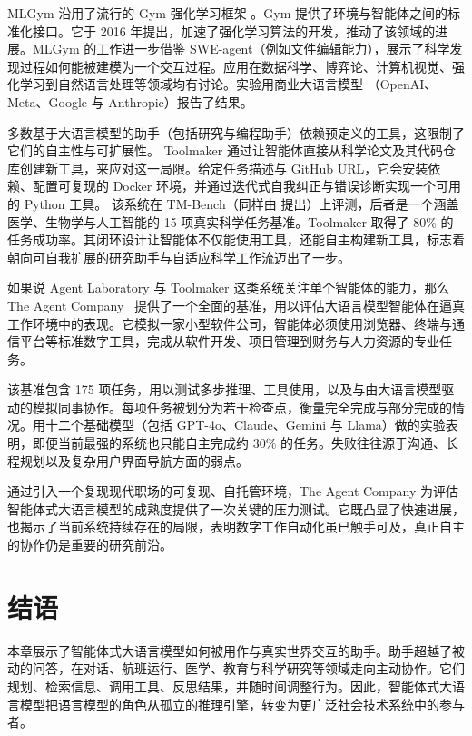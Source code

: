 MLGym \citep{nathani2025mlgym} 沿用了流行的 Gym 强化学习框架 \citep{brockman2016openai}。Gym 提供了环境与智能体之间的标准化接口。它于 2016 年提出，加速了强化学习算法的开发，推动了该领域的进展。MLGym 的工作进一步借鉴 SWE-agent（例如文件编辑能力），展示了科学发现过程如何能被建模为一个交互过程。应用在数据科学、博弈论、计算机视觉、强化学习到自然语言处理等领域均有讨论。实验用商业大语言模型
（OpenAI、Meta、Google 与 Anthropic）报告了结果。

多数基于大语言模型的助手（包括研究与编程助手）依赖预定义的工具，这限制了它们的自主性与可扩展性。
%
Toolmaker \citep{wolflein2025llm} 通过让智能体直接从科学论文及其代码仓库创建新工具，来应对这一局限。给定任务描述与 GitHub URL，它会安装依赖、配置可复现的 Docker 环境，并通过迭代式自我纠正与错误诊断实现一个可用的 Python 工具。
该系统在 TM-Bench（同样由 \citet{wolflein2025llm} 提出）上评测，后者是一个涵盖医学、生物学与人工智能的 15 项真实科学任务基准。Toolmaker 取得了 80\% 的任务成功率。其闭环设计让智能体不仅能使用工具，还能自主构建新工具，标志着朝向可自我扩展的研究助手与自适应科学工作流迈出了一步。


如果说 Agent Laboratory 与 Toolmaker 这类系统关注单个智能体的能力，那么 The Agent Company~\citep{xu2024theagentcompany} 提供了一个全面的基准，用以评估大语言模型智能体在逼真工作环境中的表现。它模拟一家小型软件公司，智能体必须使用浏览器、终端与通信平台等标准数字工具，完成从软件开发、项目管理到财务与人力资源的专业任务。

该基准包含 175 项任务，用以测试多步推理、工具使用，以及与由大语言模型驱动的模拟同事协作。每项任务被划分为若干检查点，衡量完全完成与部分完成的情况。用十二个基础模型（包括 GPT-4o、Claude、Gemini 与 Llama）做的实验表明，即便当前最强的系统也只能自主完成约 30\% 的任务。失败往往源于沟通、长程规划以及复杂用户界面导航方面的弱点。

通过引入一个复现现代职场的可复现、自托管环境，The Agent Company 为评估智能体式大语言模型的成熟度提供了一次关键的压力测试。它既凸显了快速进展，也揭示了当前系统持续存在的局限，表明数字工作自动化虽已触手可及，真正自主的协作仍是重要的研究前沿。


\section{结语}

本章展示了智能体式大语言模型如何被用作与真实世界交互的助手。助手超越了被动的问答，在对话、航班运行、医学、教育与科学研究等领域走向主动协作。它们规划、检索信息、调用工具、反思结果，并随时间调整行为。因此，智能体式大语言模型把语言模型的角色从孤立的推理引擎，转变为更广泛社会技术系统中的参与者。

